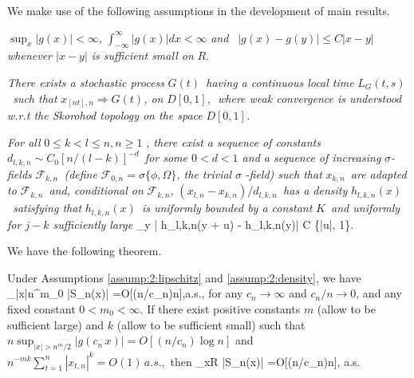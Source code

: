 We make use of the following assumptions in the development of main results.

\medskip
\begin{assump} 
	$\sup_x|g(x)|<\infty$, $\int_{-\infty}^{\infty}|g(x)|dx<\infty$ \textit{and }\textit{\
	$|g(x)-g(y)|\le C|x-y|$ whenever  $|x-y|$ is sufficient small on }$R$.
\end{assump}

\medskip
\begin{assump} 
\textit{There exists a stochastic process }%
$G(t)$\textit{\ having a continuous local time
}$L_{G}(t,s)$\textit{\ such that }$x_{[nt],n}\Rightarrow
G(t)$\textit{, on }$D[0,1],$\textit{\ where
weak convergence is understood w.r.t the Skorohod topology on the space }$%
D[0,1]$\textit{.}
\end{assump}

\medskip
\begin{assump} 
 \textit{For all }$0\leq k<l\leq n,n\geq 1$ \textit{, there exist a sequence of constants }$d_{l,k,n}\sim C_0 [n/(l-k)]^{-d}$\textit{\ for some $0< d<1$
and a
sequence of increasing }$\sigma $\textit{-fields }${\mathcal F}_{k,n}$\textit{\ (define }$%
{\mathcal F}_{0,n}=\sigma \{\phi ,\Omega \}$\textit{, the trivial }$\sigma $\textit{%
-field) such that} $x_{k,n}$\textit{\ are adapted to }${\mathcal F}_{k,n}$\textit{\
and, conditional on }${\mathcal F}_{k,n}$\textit{,
}$(x_{l,n}-x_{k,n})/d_{l,k,n}$\textit{\ has a density
}$h_{l,k,n}(x)$\textit{\ satisfying that }$h_{l,k,n}(x)$\textit{\ is
uniformly bounded by a constant }$K$\textit{\ and uniformly for $j-k$ sufficiently large}
\be
 \sup_y | h_{l,k,n}(y + u) - h_{l,k,n}(y)| \le C \min\{|u|, 1\}. \la {eqn:2:77}
\ee
\end{assump}

We have the following theorem.

\begin{thm}   Under Assumptions \ref{assump:2:lipschitz} and \ref{assump:2:density}, we have
\be {}
\sup_{|x|\le n^{m_0}} |S_n(x)| =O[(n/c_n)\log n],\quad a.s., \la {eqn:2:ad1}
\ee
 for any $c_n\to\infty$ and $c_n/n\to 0$, and any fixed constant $0<m_0<\infty$. If there exist positive constants  $m$ (allow to be sufficient large) and
 $k$ (allow to be sufficient small) such that $n\sup_{|x|>n^{m}/2}|g(c_n\, x)|=O[(n/c_n)\log n]$  and $
n^{-m k} \sum_{t=1}^n |x_{t,n}|^k  = O(1)\, a.s.,
$
then
\be
\sup_{x\in R} |S_n(x)| =O[(n/c_n)\log n], \quad a.s. 
\ee
\end{thm}


